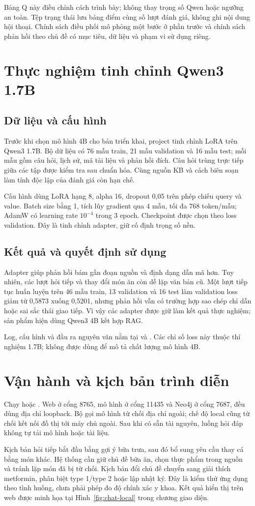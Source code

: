 Bảng Q này điều chỉnh cách trình bày; không thay trọng số Qwen hoặc ngưỡng an toàn. Tệp trạng thái lưu bảng điểm cùng số lượt đánh giá, không ghi nội dung hội thoại. Chính sách điều phối mô phỏng một bước ở phần trước và chính sách phản hồi theo chủ đề có mục tiêu, dữ liệu và phạm vi sử dụng riêng.
\section{Thực nghiệm tinh chỉnh Qwen3 1.7B}
\subsection{Dữ liệu và cấu hình}
Trước khi chọn mô hình 4B cho bản triển khai, project tinh chỉnh LoRA trên Qwen3 1.7B. Bộ dữ liệu có 76 mẫu train, 21 mẫu validation và 16 mẫu test; mỗi mẫu gồm câu hỏi, lịch sử, mã tài liệu và phản hồi đích. Câu hỏi trùng trực tiếp giữa các tập được kiểm tra sau chuẩn hóa. Cùng nguồn KB và cách biên soạn làm tính độc lập của đánh giá còn hạn chế.

Cấu hình dùng LoRA hạng 8, alpha 16, dropout 0,05 trên phép chiếu query và value. Batch size bằng 1, tích lũy gradient qua 4 mẫu, tối đa 768 token/mẫu; AdamW có learning rate $10^{-4}$ trong 3 epoch. Checkpoint được chọn theo loss validation. Đây là tinh chỉnh adapter, giữ cố định trọng số nền.

\subsection{Kết quả và quyết định sử dụng}
Adapter giúp phản hồi bám gần đoạn nguồn và định dạng dẫn mã hơn. Tuy nhiên, các lượt hỏi tiếp và thay đổi món ăn còn dễ lặp văn bản cũ. Một lượt tiếp tục huấn luyện trên 46 mẫu train, 13 validation và 16 test làm validation loss giảm từ 0,5873 xuống 0,5201, nhưng phản hồi vẫn có trường hợp sao chép chỉ dẫn hoặc sai sắc thái giao tiếp. Vì vậy các adapter được giữ làm kết quả thực nghiệm; sản phẩm hiện dùng Qwen3 4B kết hợp RAG.

Log, cấu hình và đầu ra nguyên văn nằm tại  và . Các chỉ số loss này thuộc thí nghiệm 1.7B; không được dùng để mô tả chất lượng mô hình 4B.
\section{Vận hành và kịch bản trình diễn}
Chạy  hoặc . Web ở cổng 8765, mô hình ở cổng 11435 và Neo4j ở cổng 7687, đều dùng địa chỉ loopback. Bộ gọi mô hình từ chối địa chỉ ngoài; chế độ local cũng từ chối kết nối đồ thị tới máy chủ ngoài. Sau khi có sẵn tài nguyên, luồng hỏi đáp không tự tải mô hình hoặc tài liệu.

Kịch bản hỏi tiếp bắt đầu bằng gợi ý bữa trưa, sau đó bổ sung yêu cầu thay cá bằng món khác. Hệ thống cần giữ chủ đề bữa ăn, chọn thực phẩm trong nguồn và tránh lặp món đã bị từ chối. Kịch bản đổi chủ đề chuyển sang giải thích metformin, phân biệt type 1/type 2 hoặc lập nhật ký. Đây là kiểm thử ứng dụng theo tình huống, chưa phải phép đo độ chính xác y khoa.
Kết quả hiển thị trên web được minh họa tại Hình~\ref{fig:chat-local} trong chương giao diện.
